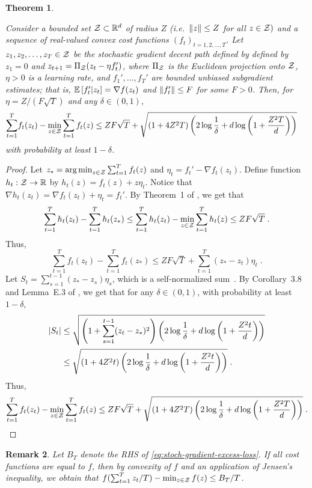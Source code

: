 \documentclass[11pt]{article}
\newtheorem{theorem}{Theorem}
\newtheorem{remark}[theorem]{Remark}
\begin{document}
\begin{theorem}
  \label{thm:stoch-gradient}

  Consider a bounded set ${\cal Z}\subset\mathbb R^d$ of radius $Z$ (i.e.\  $\left\Vert z\right\Vert\le Z$ for all $z\in{\cal Z})$ and a sequence of real-valued convex cost functions $(f_t)_{t=1,2,\dots,T}$. Let $z_1,z_2,\dots,z_T\in {\cal Z}$ be the stochastic gradient decent path defined by defined by $z_1=0$  and $z_{t+1} = \Pi_{{\cal Z}} (z_t - \eta f_t')$, where $\Pi_{{\cal Z}}$ is the Euclidean projection onto ${\cal Z}$, $\eta>0$ is a learning rate, and $f_1',\dots,f_T'$ are bounded unbiased subgradient estimates; that is,  $\operatorname*{\mathbb E}\left[f_t' | z_t\right] = \nabla f(z_t)$ and $\left\Vert f_t'\right\Vert\le F$ for some $F>0$. Then, for $\eta = Z/(F\sqrt{T})$ and any $\delta\in (0,1)$,
\begin{align}
\label{eq:stoch-gradient-excess-loss}
\sum_{t=1}^T &f_t(z_t) - \min_{z\in{\cal Z}} \sum_{t=1}^T f_t(z) \le Z F \sqrt{T} + \sqrt{(1 + 4 Z^2 T ) \left(2 \log\frac{1}{\delta} + d \log \left( 1 + \frac{Z^2 T}{d} \right) \right) } \;
\end{align}
 with probability at least $1-\delta$.
\end{theorem}
\begin{proof}
Let $z_* = \operatorname*{arg\,min}_{z\in{\cal Z}} \sum_{t=1}^T f_t(z)$ and $\eta_t = f_t' - \nabla f_t (z_t)$. Define function $h_t:{\cal Z}\rightarrow\mathbb R$ by $h_t(z) = f_t(z) + z \eta_t$. Notice that $\nabla h_t(z_t) = \nabla f_t(z_t) + \eta_t = f_t'$. By Theorem~1 of \citet{Zinkevich-2003}, we get that
\[
\sum_{t=1}^T h_t(z_t) - \sum_{t=1}^T h_t(z_*) \le \sum_{t=1}^T h_t(z_t) - \min_{z\in{\cal Z}}\sum_{t=1}^T h_t(z) \le Z F \sqrt{T} \; .
\]
Thus,
\[
\sum_{t=1}^T f_t(z_t) - \sum_{t=1}^T f_t(z_*) \le Z F \sqrt{T} + \sum_{t=1}^T (z_* - z_t) \eta_t \; .
\]
Let $S_t = \sum_{s=1}^{t-1} (z_* - z_s) \eta_s$, which is a self-normalized sum~\citep{delaPena-Lai-Shao-2009}. By Corollary~3.8 and Lemma~E.3 of \citet{Abbasi-Yadkori-2012}, we get that for any $\delta\in (0,1)$, with probability at least $1-\delta$,
\begin{align*}
\left\vert S_t\right\vert &\le \sqrt{\left(1 + \sum_{s=1}^{t-1} (z_t - z_*)^2 \right) \left(2 \log\frac{1}{\delta} + d \log \left( 1 + \frac{Z^2 t}{d} \right) \right) }  \\
&\le \sqrt{(1 + 4 Z^2 t ) \left(2 \log\frac{1}{\delta} + d \log \left( 1 + \frac{Z^2 t}{d} \right) \right) } \; .
\end{align*}
Thus,
\[
\sum_{t=1}^T f_t(z_t) - \min_{z\in{\cal Z}} \sum_{t=1}^T f_t(z) \le Z F \sqrt{T} + \sqrt{(1 + 4 Z^2 T ) \left(2 \log\frac{1}{\delta} + d \log \left( 1 + \frac{Z^2 T}{d} \right) \right) } \; .
\]
\end{proof}
\begin{remark}
\label{rem:Jensen}
Let $B_T$ denote the RHS of \eqref{eq:stoch-gradient-excess-loss}.
If all cost functions are equal to $f$, then by convexity of $f$ and an application of Jensen's inequality, we obtain that $f(\sum_{t=1}^T z_t/T) - \min_{z\in {\cal Z}} f(z) \le B_T/T$.
\end{remark}
\end{document}
